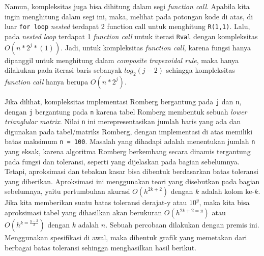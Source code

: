 \documentclass[journal,12pt,onecolumn,a4paper]{IEEEtran}
\begin{document}
Namun, kompleksitas juga bisa dihitung dalam segi \emph{function call}. Apabila kita ingin menghitung dalam segi ini, maka, melihat pada potongan kode di atas, di luar \lstinline{for loop} \emph{nested} terdapat 2 function call untuk menghitung \lstinline{R(1,1)}.
Lalu, pada \emph{nested loop} terdapat 1 \emph{function call} untuk iterasi \lstinline{Rval} dengan kompleksitas \(O(n*2^j*(1))\). Jadi, untuk kompleksitas \emph{function call}, karena fungsi hanya dipanggil untuk menghitung dalam \emph{composite trapezoidal rule}, maka hanya dilakukan pada iterasi baris sebanyak \(log_2 (j-2)\) sehingga kompleksitas \emph{function call} hanya berupa \(O(n*2^j)\).

Jika dilihat, kompleksitas implementasi Romberg bergantung pada \lstinline{j} dan \lstinline{n}, dengan \lstinline{j} bergantung pada \lstinline{n} karena tabel Romberg membentuk sebuah \emph{lower trianglular matrix}. Nilai \lstinline{n} ini merepresentasikan jumlah baris yang ada dan digunakan pada tabel/matriks Romberg, dengan implementasi di atas memiliki batas maksimum \lstinline{n = 100}.
Masalah yang dihadapi adalah menentukan jumlah \lstinline{n} yang eksak, karena algoritma Romberg berkembang secara dinamis tergantung pada fungsi dan toleransi, seperti yang dijelaskan pada bagian sebelumnya. Tetapi, aproksimasi dan tebakan kasar bisa dibentuk berdasarkan batas toleransi yang diberikan. Aproksimasi ini menggunakan teori yang disebutkan pada bagian sebelumnya, yaitu pertumbuhan akurasi \(O(h^{2k+2})\) dengan \(k\) adalah kolom ke-\(k\).
Jika kita memberikan suatu batas toleransi derajat-y atau \(10^y\), maka kita bisa aproksimasi tabel yang dihasilkan akan berukuran \(O(h^{2k+2 = y})\) atau \(O(h^{k=\frac{y-2}{2}})\) dengan \(k\) adalah \(n\).
Sebuah percobaan dilakukan dengan premis ini. Menggunakan spesifikasi di awal, maka dibentuk grafik yang memetakan dari berbagai batas toleransi sehingga menghasilkan hasil berikut.
\end{document}
